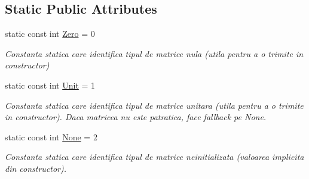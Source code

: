 \subsection*{Static Public Attributes}
\begin{DoxyCompactItemize}
\item 
\hypertarget{classMatrix_a598b23c7c96c1a1c068bbf49ef4ea8ac}{
static const int \hyperlink{classMatrix_a598b23c7c96c1a1c068bbf49ef4ea8ac}{Zero} = 0}
\label{classMatrix_a598b23c7c96c1a1c068bbf49ef4ea8ac}

\begin{DoxyCompactList}\small\item\em Constanta statica care identifica tipul de matrice nula (utila pentru a o trimite in constructor) \end{DoxyCompactList}\item 
\hypertarget{classMatrix_a39799dca149367cbeefb335cbd349c7e}{
static const int \hyperlink{classMatrix_a39799dca149367cbeefb335cbd349c7e}{Unit} = 1}
\label{classMatrix_a39799dca149367cbeefb335cbd349c7e}

\begin{DoxyCompactList}\small\item\em Constanta statica care identifica tipul de matrice unitara (utila pentru a o trimite in constructor). Daca matricea nu este patratica, face fallback pe None. \end{DoxyCompactList}\item 
\hypertarget{classMatrix_ac576343229d4c60eb7270123baf1eb08}{
static const int \hyperlink{classMatrix_ac576343229d4c60eb7270123baf1eb08}{None} = 2}
\label{classMatrix_ac576343229d4c60eb7270123baf1eb08}

\begin{DoxyCompactList}\small\item\em Constanta statica care identifica tipul de matrice neinitializata (valoarea implicita din constructor). \end{DoxyCompactList}\end{DoxyCompactItemize}
